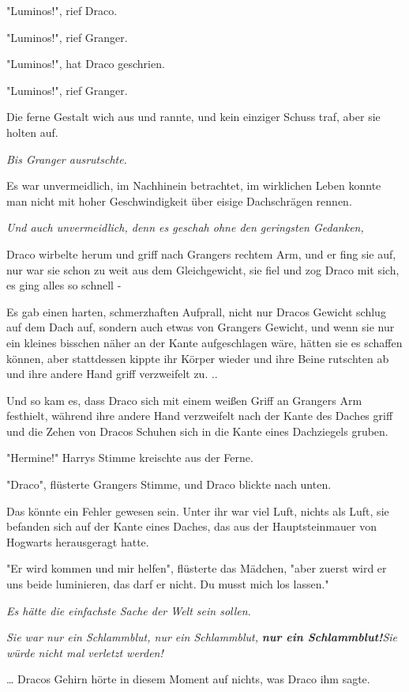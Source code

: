 {"Luminos!", rief Draco.

"Luminos!", rief Granger.

"Luminos!", hat Draco geschrien.

"Luminos!", rief Granger.

Die ferne Gestalt wich aus und rannte, und kein einziger Schuss traf, aber sie holten auf.

\emph{\hfill\break Bis Granger ausrutschte.}

Es war unvermeidlich, im Nachhinein betrachtet, im wirklichen Leben konnte man nicht mit hoher Geschwindigkeit über eisige Dachschrägen rennen.

\emph{Und auch unvermeidlich, denn es geschah ohne den geringsten Gedanken,}

Draco wirbelte herum und griff nach Grangers rechtem Arm, und er fing sie auf, nur war sie schon zu weit aus dem Gleichgewicht, sie fiel und zog Draco mit sich, es ging alles so schnell -

Es gab einen harten, schmerzhaften Aufprall, nicht nur Dracos Gewicht schlug auf dem Dach auf, sondern auch etwas von Grangers Gewicht, und wenn sie nur ein kleines bisschen näher an der Kante aufgeschlagen wäre, hätten sie es schaffen können, aber stattdessen kippte ihr Körper wieder und ihre Beine rutschten ab und ihre andere Hand griff verzweifelt zu. ..

Und so kam es, dass Draco sich mit einem weißen Griff an Grangers Arm festhielt, während ihre andere Hand verzweifelt nach der Kante des Daches griff und die Zehen von Dracos Schuhen sich in die Kante eines Dachziegels gruben.

"Hermine!" Harrys Stimme kreischte aus der Ferne.

"Draco", flüsterte Grangers Stimme, und Draco blickte nach unten.

Das könnte ein Fehler gewesen sein. Unter ihr war viel Luft, nichts als Luft, sie befanden sich auf der Kante eines Daches, das aus der Hauptsteinmauer von Hogwarts herausgeragt hatte.

"Er wird kommen und mir helfen", flüsterte das Mädchen, "aber zuerst wird er uns beide luminieren, das darf er nicht. Du musst mich los lassen."

\emph{Es hätte die einfachste Sache der Welt sein sollen.}

\emph{Sie war nur ein Schlammblut, nur ein Schlammblut,} \textbf{\emph{nur ein Schlammblut!}}\emph{\hfill\break Sie würde nicht mal verletzt werden!}

… Dracos Gehirn hörte in diesem Moment auf nichts, was Draco ihm sagte.

}
